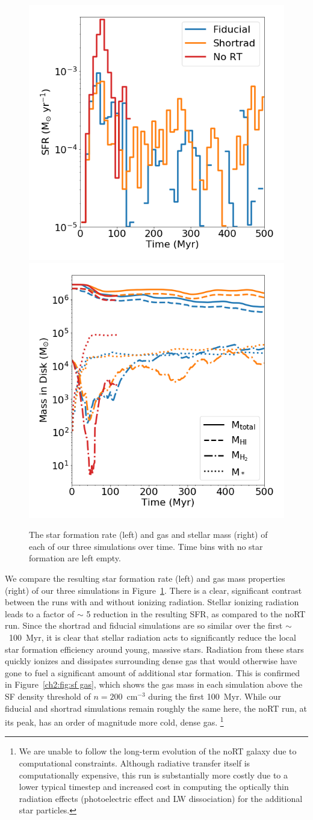\begin{figure}
\centering
\includegraphics[width=0.49\linewidth]{figures/ch2/sfr}
\includegraphics[width=0.49\linewidth]{figures/ch2/mass}
\caption{The star formation rate (left) and gas and stellar mass (right) of each of our three simulations over time. Time bins with no star formation are left empty.}
\label{ch2:fig:sfr_mass_evolution}
\end{figure}

We compare the resulting star formation rate (left) and gas mass properties (right) of our three simulations in Figure~\ref{ch2:fig:sfr_mass_evolution}. There is a clear, significant contrast between the runs with and without ionizing radiation. Stellar ionizing radiation leads to a factor of $\sim$ 5 reduction in the resulting SFR, as compared to the noRT run. Since the shortrad and fiducial simulations are so similar over the first $\sim$~100~Myr, it is clear that stellar radiation acts to significantly reduce the local star formation efficiency around young, massive stars. Radiation from these stars quickly ionizes and dissipates surrounding dense gas that would otherwise have gone to fuel a significant amount of additional star formation. This is confirmed in Figure~\ref{ch2:fig:sf gas}, which shows the gas mass in each simulation above the SF density threshold of $n = 200$~cm$^{-3}$ during the first 100~Myr. While our fiducial and shortrad simulations remain roughly the same here, the noRT run, at its peak, has an order of magnitude more cold, dense gas. \footnote{We are unable to follow the long-term evolution of the noRT galaxy due to computational constraints. Although radiative transfer itself is computationally expensive, this run is substantially more costly due to a lower typical timestep and increased cost in computing the optically thin radiation effects (photoelectric effect and LW dissociation) for the additional star particles.}

